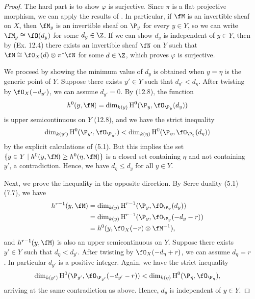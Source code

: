 \documentclass[a4paper]{article}
\begin{document}
\begin{enumerate} [label=\textbf{\arabic*.}, leftmargin=0em]
\begin{proof}
          The hard part is to show $\varphi$ is surjective.
          Since $\pi$ is a flat projective morphism, we can apply the results of .
          In particular, if $\fM$ is an invertible sheaf on $X$, then $\fM_y$ is an invertible sheaf on $\P_y$ for every $y \in Y$, so we can write $\fM_y \cong \fO(d_y)$ for some $d_y \in \Z$.
          If we can show $d_y$ is independent of $y \in Y$, then by (Ex. 12.4) there exists an invertible sheaf $\fN$ on $Y$ such that $\fM \cong \fO_X(d) \otimes \pi^*\fN$ for some $d \in \Z$, which proves $\varphi$ is surjective.

          We proceed by showing the minimum value of $d_y$ is obtained when $y = \eta$ is the generic point of $Y$.
          Suppose there exists $y' \in Y$ such that $d_{y'} < d_\eta$.
          After twisting by $\fO_X(-d_{y'})$, we can assume $d_{y'} = 0$.
          By (12.8), the function
          \begin{equation*}
            \cdh^0(y, \fM) = \dim_{k(y)} \cH^0(\P_y, \fO_{\P_y}(d_y))
          \end{equation*}
          is upper semicontinuous on $Y$ (12.8), and we have the strict inequality
          \begin{equation*}
            \dim_{k(y')} \cH^0(\P_{y'}, \fO_{\P_{y'}}) < \dim_{k(\eta)} \cH^0(\P_{\eta}, \fO_{\P_{\eta}}(d_\eta))
          \end{equation*}
          by the explicit calculations of (5.1).
          But this implies the set $\{y \in Y \mid \cdh^0(y, \fM) \geq h^0(\eta, \fM)\}$ is a closed set containing $\eta$ and not containing $y'$, a contradiction.
          Hence, we have $d_\eta \leq d_{y}$ for all $y \in Y$.

          Next, we prove the inequality in the opposite direction.
          By Serre duality (5.1) (7.7), we have
          \begin{align*}
          \cdh^{r-1}(y, \fM) & = \dim_{k(y)} \cH^{r-1}(\P_{y}, \fO_{\P_{y}}(d_y))    \\
                            & = \dim_{k(y)} \cH^{r-1}(\P_{y}, \fO_{\P_{y}}(-d_y-r)) \\
                            & = \cdh^0(y, \fO_X(-r) \otimes \fM^{-1}),
          \end{align*}
          and $\cdh^{r-1}(y, \fM)$ is also an upper semicontinuous on $Y$.
          Suppose there exists $y' \in Y$ such that $d_\eta < d_{y'}$.
          After twisting by $\fO_X(-d_\eta + r)$, we can assume $d_\eta = r$.
          In particular $d_{y'}$ is a positive integer.
          Again, we have the strict inequality
          \begin{equation*}
            \dim_{k(y')} \cH^0(\P_{y'}, \fO_{\P_{y'}}(-d_{y'}-r)) < \dim_{k(\eta)} \cH^0(\P_{\eta}, \fO_{\P_{\eta}}),
          \end{equation*}
          arriving at the same contradiction as above.
          Hence, $d_y$ is independent of $y \in Y$.
        \end{proof}


\end{enumerate}
\end{document}
